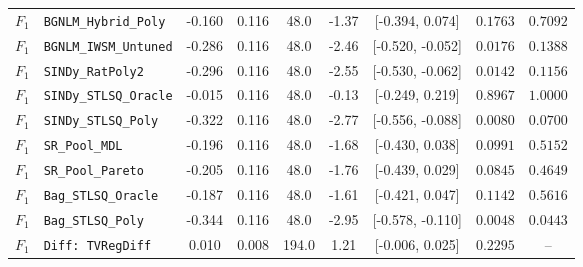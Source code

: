 \begin{table}[t]
\begin{tabular}{llccccccc}
$F_1$ & \texttt{BGNLM\_Hybrid\_Poly} & -0.160 & 0.116 & 48.0 & -1.37 & [-0.394, 0.074] & $0.1763$ & $0.7092$ \\
$F_1$ & \texttt{BGNLM\_IWSM\_Untuned} & -0.286 & 0.116 & 48.0 & -2.46 & [-0.520, -0.052] & $0.0176$ & $0.1388$ \\
$F_1$ & \texttt{SINDy\_RatPoly2} & -0.296 & 0.116 & 48.0 & -2.55 & [-0.530, -0.062] & $0.0142$ & $0.1156$ \\
$F_1$ & \texttt{SINDy\_STLSQ\_Oracle} & -0.015 & 0.116 & 48.0 & -0.13 & [-0.249, 0.219] & $0.8967$ & $1.0000$ \\
$F_1$ & \texttt{SINDy\_STLSQ\_Poly} & -0.322 & 0.116 & 48.0 & -2.77 & [-0.556, -0.088] & $0.0080$ & $0.0700$ \\
$F_1$ & \texttt{SR\_Pool\_MDL} & -0.196 & 0.116 & 48.0 & -1.68 & [-0.430, 0.038] & $0.0991$ & $0.5152$ \\
$F_1$ & \texttt{SR\_Pool\_Pareto} & -0.205 & 0.116 & 48.0 & -1.76 & [-0.439, 0.029] & $0.0845$ & $0.4649$ \\
$F_1$ & \texttt{Bag\_STLSQ\_Oracle} & -0.187 & 0.116 & 48.0 & -1.61 & [-0.421, 0.047] & $0.1142$ & $0.5616$ \\
$F_1$ & \texttt{Bag\_STLSQ\_Poly} & -0.344 & 0.116 & 48.0 & -2.95 & [-0.578, -0.110] & $0.0048$ & $0.0443$ \\
$F_1$ & \texttt{Diff: TVRegDiff} & 0.010 & 0.008 & 194.0 & 1.21 & [-0.006, 0.025] & $0.2295$ & -- \\
\bottomrule
\end{tabular}
\end{table}
